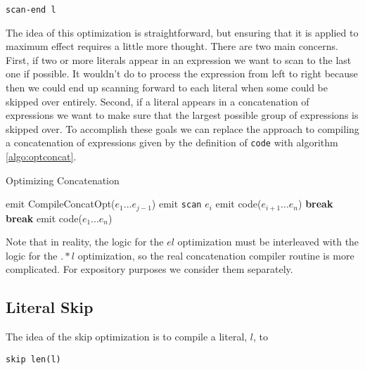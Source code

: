\begin{verbatim}
scan-end l
\end{verbatim}

The idea of this optimization is straightforward, but ensuring that
it is applied to maximum effect requires a little more thought. There
are two main concerns. First, if two or more literals appear in an
expression we want to scan to the last one if possible. It wouldn't
do to process the expression from left to right because then we could
end up scanning forward to each literal when some could be skipped over
entirely. Second, if a literal appears in a concatenation of expressions
we want to make sure that the largest possible group of expressions
is skipped over. To accomplish these goals we can replace the approach
to compiling a concatenation of expressions given by the definition of
\verb'code' with algorithm \ref{algo:optconcat}.

\begin{algorithm}
\caption{Optimizing Concatenation} \label{algo:optconcat}
\begin{algorithmic}
          \State emit CompileConcatOpt($e_1 ... e_{j-1}$)
          \State emit \verb'scan' $e_i$
          \State emit code($e_{i+1} ... e_n$)
          \State \textbf{break}
        \EndIf
      \EndFor
      \State \textbf{break}
    \EndIf
  \EndFor
    \State emit code($e_1 ... e_n$)
  \EndIf
\EndProcedure
\end{algorithmic}
\end{algorithm}

Note that in reality, the logic for the $el$ optimization must be
interleaved with the logic for the $.*l$ optimization, so the
real concatenation compiler routine is more complicated. For
expository purposes we consider them separately.

\subsection{Literal Skip}
\label{section:skipopt}

\noindent
The idea of the skip optimization is to compile a literal, $l$, to

\begin{verbatim}
skip len(l)
\end{verbatim}

